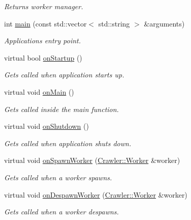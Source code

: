 \begin{DoxyCompactItemize}
\begin{DoxyCompactList}\small\item\em Returns worker manager. \end{DoxyCompactList}\item 
int \hyperlink{class_crawler_1_1_application_a0c1b381f01f73dacb6493043302136ae}{main} (const std\+::vector$<$ std\+::string $>$ \&arguments)
\begin{DoxyCompactList}\small\item\em Applications entry point. \end{DoxyCompactList}\item 
virtual bool \hyperlink{class_crawler_1_1_application_a4db5d3f489384149ec89be2d9a862277}{on\+Startup} ()
\begin{DoxyCompactList}\small\item\em Gets called when application starts up. \end{DoxyCompactList}\item 
virtual void \hyperlink{class_crawler_1_1_application_a3f5866fdfdfd85b3ce2d192eef7efd32}{on\+Main} ()
\begin{DoxyCompactList}\small\item\em Gets called inside the main function. \end{DoxyCompactList}\item 
virtual void \hyperlink{class_crawler_1_1_application_a544d41cc0fb2b5f36b44480ea4a3b14f}{on\+Shutdown} ()
\begin{DoxyCompactList}\small\item\em Gets called when application shuts down. \end{DoxyCompactList}\item 
virtual void \hyperlink{class_crawler_1_1_application_a7fe762aa7cd9d776ef593f690fd7d516}{on\+Spawn\+Worker} (\hyperlink{class_crawler_1_1_worker}{Crawler\+::\+Worker} \&worker)
\begin{DoxyCompactList}\small\item\em Gets called when a worker spawns. \end{DoxyCompactList}\item 
virtual void \hyperlink{class_crawler_1_1_application_aa6bc95edeb44f9338224862365c812d5}{on\+Despawn\+Worker} (\hyperlink{class_crawler_1_1_worker}{Crawler\+::\+Worker} \&worker)
\begin{DoxyCompactList}\small\item\em Gets called when a worker despawns. \end{DoxyCompactList}\item 

\end{DoxyCompactItemize}
